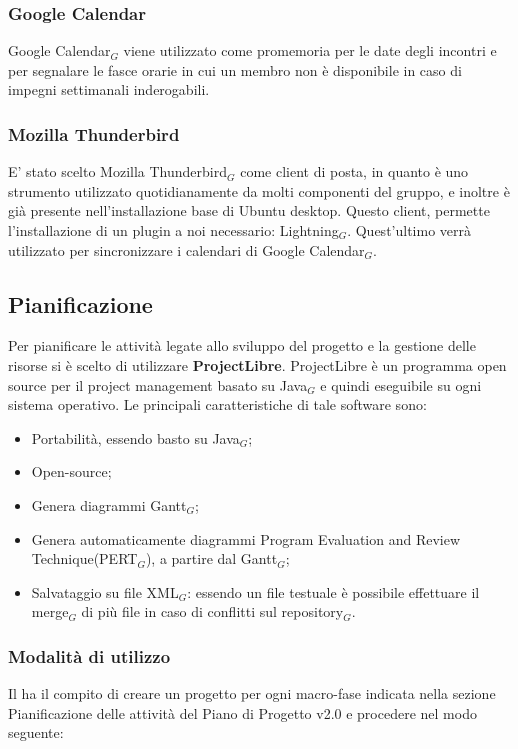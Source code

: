 \subsubsection{Google Calendar}
Google Calendar$_G$ viene utilizzato come promemoria per le date degli incontri e per segnalare le fasce orarie in cui un membro non è disponibile in caso di impegni settimanali inderogabili.

\subsubsection{Mozilla Thunderbird}
	E' stato scelto Mozilla Thunderbird$_G$ come client di posta, in quanto è uno strumento utilizzato quotidianamente da molti componenti del gruppo, e inoltre è già presente nell'installazione base di Ubuntu desktop. Questo client, permette l'installazione di un plugin a noi necessario: Lightning$_G$. Quest'ultimo verrà utilizzato per sincronizzare i calendari di Google Calendar$_G$.

\subsection{Pianificazione}
Per pianificare le attività legate allo sviluppo del progetto e la gestione delle risorse si è scelto di utilizzare \textbf{ProjectLibre}.
ProjectLibre è un programma open source per il project management basato su
Java$_G$ e quindi eseguibile su ogni sistema operativo. Le principali caratteristiche di tale software sono:
\begin{itemize}
	\item Portabilità, essendo basto su Java$_G$;
	\item Open-source;
	\item Genera diagrammi Gantt$_G$;
	\item Genera automaticamente diagrammi Program Evaluation and Review Technique(PERT$_G$), a partire dal Gantt$_G$;
	\item Salvataggio su file XML$_G$: essendo un file testuale è possibile effettuare il merge$_G$ di più file in caso di conflitti sul repository$_G$.

\end{itemize}

\subsubsection{Modalità di utilizzo}
Il \ruoloResponsabile{} ha il compito di creare un progetto per ogni macro-fase indicata nella sezione Pianificazione delle attività del Piano di Progetto v2.0 e procedere nel modo seguente:

